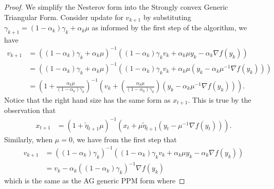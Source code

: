         \begin{proof}
            We simplify the Nesterov form into the Strongly convex Generic Triangular Form. 
            Consider update for $v_{k + 1}$ by substituting $\gamma_{k+1} = (1 - \alpha_k) \gamma_k + \alpha_k \mu$ as informed by the first step of the algorithm, we have 
            \begin{align*}
                v_{k + 1} &= 
                ((1 - \alpha_k)\gamma_k + \alpha_k \mu)^{-1}
                \left(
                    (1 - \alpha_k)\gamma_k v_k + \alpha_k \mu y_k - \alpha_k \nabla f(y_k)
                \right)
                \\
                &= ((1 - \alpha_k)\gamma_k + \alpha_k \mu)^{-1}
                (
                    (1 - \alpha_k)\gamma_k v_k + \alpha_k \mu(y_k - \alpha_k \mu^{-1}\nabla f(y_k))
                )
                \\
                &= 
                \left(
                    1 + \frac{\alpha_k \mu}{(1 - \alpha_k)\gamma_k}
                \right)^{-1}
                \left(
                    v_k
                    + 
                    \left(
                        \frac{\alpha_k \mu}{(1 - \alpha_k)\gamma_k} 
                    \right)
                    \left(
                        y_k 
                        - \alpha_k \mu^{-1}\nabla f(y_k)
                    \right)
                \right). 
            \end{align*}
            Notice that the right hand size has the same form as $x_{t + 1}$. 
            This is true by the observation that 
            \begin{align*}
                x_{t + 1} &= 
                (1 + \tilde\eta_{t + 1}\mu)^{-1}
                \left( 
                    x_t + \mu\tilde \eta_{t + 1}
                    \left(y_t - \mu^{-1}\nabla f(y_t)\right)
                \right). 
            \end{align*}
            Similarly, when $\mu = 0$, we have from the first step that 
            \begin{align*}
                v_{k + 1} 
                &= ((1 - \alpha_k)\gamma_k)^{-1}
                (
                    (1 - \alpha_k)\gamma_k v_k
                    + \alpha_k \mu y_k - \alpha_k \nabla f(y_k)
                )
                \\
                &= 
                v_k - \alpha_k((1 - \alpha_k)\gamma_k)^{-1}\nabla f(y_k)
            \end{align*}
            which is the same as the AG generic PPM form where 

\end{proof}
